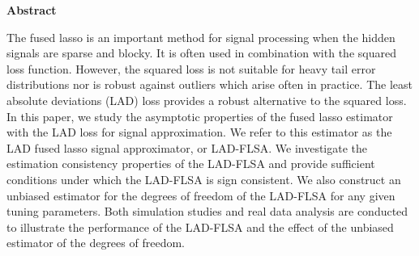 \documentclass[12pt]{article}
\begin{document}
\begin{center}
\begin{minipage}{130mm}
\begin{center}{\bf Abstract}\end{center}
%

  The fused lasso is an important method for signal processing
  when the hidden signals are sparse and blocky. It is often
  used in combination with the squared loss function.
  However, the squared loss is not suitable for heavy tail error distributions nor is robust against outliers which arise
  often in practice.  The
  least absolute deviations (LAD) loss provides a robust alternative
  to the squared loss.
 In this paper, we study the asymptotic
 properties of the  fused lasso estimator with the LAD loss for
 signal approximation. We refer to this estimator as the LAD fused
 lasso signal approximator, or LAD-FLSA.
 We investigate the  estimation consistency properties of the LAD-FLSA
 and provide sufficient conditions under which the LAD-FLSA  is
 sign consistent. We also construct an unbiased estimator for the  degrees of freedom
 of the LAD-FLSA  for any given tuning parameters.
 Both simulation studies and real data analysis are conducted to illustrate the performance of the LAD-FLSA and the effect of the unbiased estimator of the degrees of freedom.
%
%
%
%
%
%
%
%
%
%

  \end{minipage}
\end{center}
\end{document}
